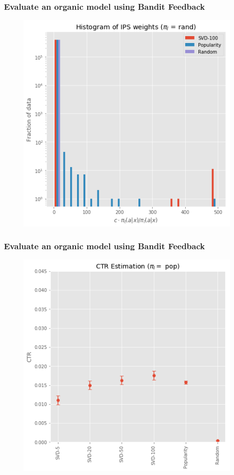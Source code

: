 \begin{frame}
  \frametitle{Evaluate an organic model using Bandit Feedback}
\begin{figure}[h!]
\includegraphics[scale=0.4]{images/evalorganicwithbandit4.png}
\centering
\label{motex1}
\end{figure}
\end{frame}

\begin{frame}
  \frametitle{Evaluate an organic model using Bandit Feedback}
\begin{figure}[h!]
\includegraphics[scale=0.4]{images/evalorganicwithbandit5.png}
\centering
\label{motex1}
\end{figure}
\end{frame}

